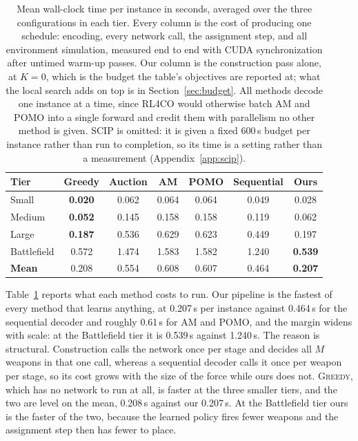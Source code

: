 \begin{table}[t]
\centering
\small
\caption{Mean wall-clock time per instance in seconds, averaged over the three
configurations in each tier. Every column is the cost of producing one
schedule: encoding, every network call, the assignment step, and all
environment simulation, measured end to end with CUDA synchronization after
untimed warm-up passes. Our column is the construction pass alone, at
$K{=}0$, which is the budget the table's objectives are reported at; what the
local search adds on top is in Section~\ref{sec:budget}. All methods decode
one instance at a time, since RL4CO would otherwise batch AM and POMO into a
single forward and credit them with parallelism no other method is given.
SCIP is omitted: it is given a fixed 600\,s budget per instance rather than
run to completion, so its time is a setting rather than a measurement
(Appendix~\ref{app:scip}).}
\label{tab:timing}
\begin{tabular}{@{}lcccccc@{}}
\toprule
Tier & Greedy & Auction & AM & POMO & Sequential & Ours \\
\midrule
Small       & \textbf{0.020} & 0.062 & 0.064 & 0.064 & 0.049 & 0.028 \\
Medium      & \textbf{0.052} & 0.145 & 0.158 & 0.158 & 0.119 & 0.062 \\
Large       & \textbf{0.187} & 0.536 & 0.629 & 0.623 & 0.449 & 0.197 \\
Battlefield & 0.572 & 1.474 & 1.583 & 1.582 & 1.240 & \textbf{0.539} \\
\midrule
\textbf{Mean} & 0.208 & 0.554 & 0.608 & 0.607 & 0.464 & \textbf{0.207} \\
\bottomrule
\end{tabular}
\end{table}

Table~\ref{tab:timing} reports what each method costs to run. Our pipeline is
the fastest of every method that learns anything, at 0.207\,s per instance
against 0.464\,s for the sequential decoder and roughly 0.61\,s for AM and
POMO, and the margin widens with scale: at the Battlefield tier it is 0.539\,s
against 1.240\,s. The reason is structural. Construction calls the network
once per stage and decides all $M$ weapons in that one call, whereas a
sequential decoder calls it once per weapon per stage, so its cost grows with
the size of the force while ours does not. \textsc{Greedy}, which has no
network to run at all, is faster at the three smaller tiers, and the two are
level on the mean, 0.208\,s against our 0.207\,s. At the Battlefield tier ours
is the faster of the two, because the learned policy fires fewer weapons and
the assignment step then has fewer to place.


